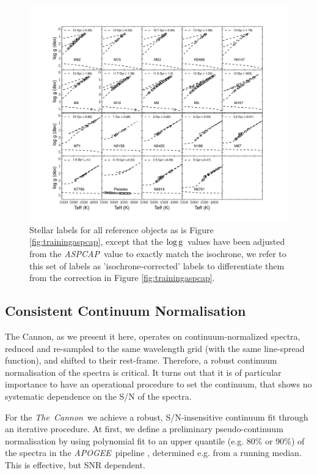 \documentclass[12pt, preprint]{aastex}
\newcommand{\logg}{\mbox{$\rm \log g$}}
\newcommand{\tc}{\textsl{The~Cannon}}
\newcommand{\apogee}{\textsl{APOGEE}}
\newcommand{\aspcap}{\textsl{ASPCAP}}
\begin{document}
\begin{figure}[h!]
\centering
  \includegraphics[scale=0.33]{./plots/training_mkn2.pdf}
\caption{Stellar labels for all reference objects as is Figure \ref{fig:trainingaspcap}, except that the \logg\ values have been adjusted from the \aspcap\ value to exactly match the isochrone, we refer to this set of labels as  'isochrone-corrected' labels to differentiate them from the correction in Figure \ref{fig:trainingaspcap}.  }
\label{fig:trainingisochrone}
\end{figure}


\subsection{Consistent Continuum Normalisation}

The Cannon, as we present it here, operates on continuum-normalized spectra, reduced and re-sampled to the same wavelength grid (with the same line-spread function), and shifted to their rest-frame. 
 Therefore, a robust continuum normalisation of the spectra is critical.
It turns out that it is of particular importance to have an operational procedure to set the continuum,
that shows no systematic dependence on the S/N of the spectra.

For the \tc\ we achieve a robust, S/N-insensitive continuum fit through 
an iterative procedure. At first, we define a preliminary pseudo-continuum normalisation by 
using polynomial fit to an upper quantile (e.g. 80\% or 90\%) of the spectra
 in the \apogee\ pipeline \citep{Meszaros2013}, determined e.g. from a running median.
 This is effective, but SNR dependent.
  
\end{document}
